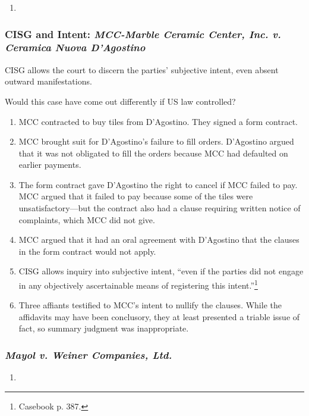 \begin{enumerate}
    \item %
\end{enumerate}

\subsubsection{CISG and Intent: \emph{MCC-Marble Ceramic Center, Inc. v. 
Ceramica Nuova D'Agostino}}

CISG allows the court to discern the parties' subjective intent, even absent 
outward manifestations.

Would this case have come out differently if US law controlled?

\begin{enumerate}
    \item MCC contracted to buy tiles from D'Agostino. They signed a form 
    contract.
    \item MCC brought suit for D'Agostino's failure to fill orders. D'Agostino 
    argued that it was not obligated to fill the orders because MCC had 
    defaulted on earlier payments.
    \item The form contract gave D'Agostino the right to cancel if MCC failed 
    to pay. MCC argued that it failed to pay because some of the tiles were 
    unsatisfactory---but the contract also had a clause requiring written 
    notice of complaints, which MCC did not give.
    \item MCC argued that it had an oral agreement with D'Agostino that the 
    clauses in the form contract would not apply.
    \item CISG allows inquiry into subjective intent, ``even if the parties 
    did not engage in any objectively ascertainable means of registering this 
    intent.''\footnote{Casebook p. 387.}
    \item Three affiants testified to MCC's intent to nullify the clauses. 
    While the affidavits may have been conclusory, they at least presented a 
    triable issue of fact, so summary judgment was inappropriate.
\end{enumerate}

\subsubsection{\emph{Mayol v. Weiner Companies, Ltd.}}

\begin{enumerate}
    \item %
\end{enumerate}


